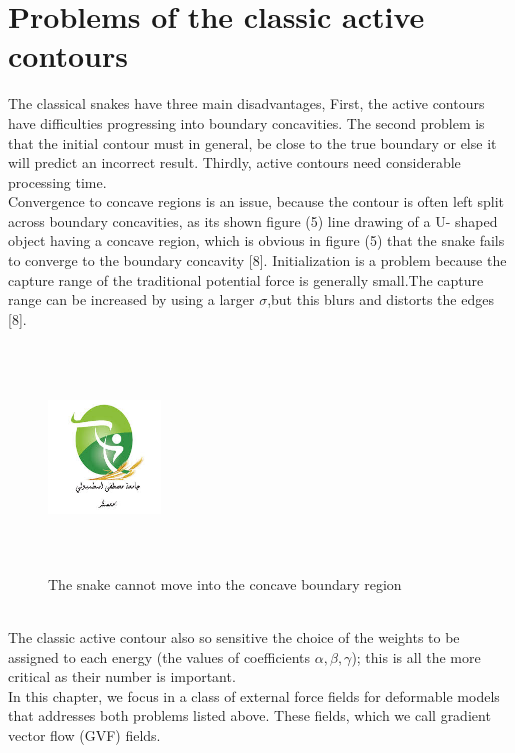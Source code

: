 \section{Problems of the classic active contours}\label{sec:problems-of-the-classic-active-contours}
\hspace{1cm}The classical snakes have three main disadvantages, First, the active
contours have difficulties progressing into boundary concavities. The
second problem is that the initial contour must in general, be close to
the true boundary or else it will predict an incorrect result. Thirdly,
active contours need considerable processing time.\\
Convergence to concave regions is an issue, because the contour is often left
split across boundary concavities, as its shown figure (5) line drawing of a U-
shaped object having a concave region, which is obvious in figure (5) that the
snake fails to converge to the boundary concavity [8].
Initialization is a problem because the capture range of the traditional potential
force is generally small.The capture range can be increased by using a larger
$\sigma$,but this blurs and distorts the edges [8].
\begin{figure}[h]
        \centering
        \includegraphics[width=3cm, height=6cm]{figurs/logouniv.jpeg}
        \caption{The snake cannot move into the concave boundary region}


\end{figure}\\
The classic active contour also so sensitive the choice of the weights to be
assigned to each energy (the values of coefficients $\alpha, \beta, \gamma$); this is all the more
critical as their number is important.\\
In this chapter, we focus in a class of external force fields for deformable
models that addresses both problems listed above. These fields, which we call
gradient vector flow (GVF) fields.
